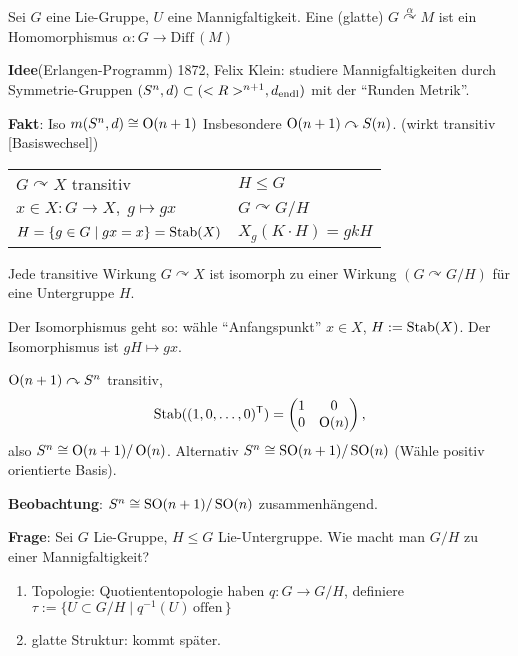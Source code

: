 \begin{definition}
	Sei $G$ eine Lie-Gruppe, $U$ eine Mannigfaltigkeit. Eine (glatte)  $G\overset{\alpha}{\curvearrowright} M$ ist ein Homomorphismus $\alpha\colon G\to \mathrm{Diff}\,(M)$
\end{definition}

\textbf{Idee}(Erlangen-Programm) 1872, Felix Klein: studiere Mannigfaltigkeiten durch Symmetrie-Gruppen $(S^n, d)\subset (<R>^{n+1}, d_{\mathrm{endl}})$ mit der "`Runden Metrik"'.

\textbf{Fakt}: Iso $m(S^n,d)\cong \operatorname{O}(n+1)$ Insbesondere $\operatorname{O}(n+1)\curvearrowright S(n)$. (wirkt transitiv [Basiswechsel])

\begin{tabularx}{\linewidth}{ll}
	$G\curvearrowright X$ transitiv & $H\le G$ \\$x\in X\colon G\to X,\; g\mapsto gx$ & $G\curvearrowright G\slash H$ \\ $H = \{g\in G\mid gx=x\} = \operatorname{Stab}(X)$ & $X_g(K\cdot H) = gk H$
\end{tabularx}

\begin{proposition}
	Jede transitive Wirkung $G\curvearrowright X$ ist isomorph zu einer Wirkung $(G\curvearrowright G\slash H)$ für eine Untergruppe $H$.
	
	Der Isomorphismus geht so: wähle "`Anfangspunkt"' $x\in X$, $H:=\operatorname{Stab}(X)$. Der Isomorphismus ist $gH\mapsto gx$.
\end{proposition}

\begin{*example}
	$\operatorname{O}(n+1)\curvearrowright S^n$ transitiv, \begin{align*}
	\operatorname{Stab}((1,0,\dots,0)^\mathsf{T}) = \begin{pmatrix}
		1 & 0 \\ 0 & \operatorname{O}(n)
	\end{pmatrix},
	\end{align*}
	also $S^n\cong\operatorname{O}(n+1)\slash \operatorname{O}(n)$. Alternativ $S^n\cong \operatorname{SO}(n+1)\slash \operatorname{SO}(n)$ (Wähle positiv orientierte Basis).
\end{*example}

\textbf{Beobachtung}: $S^n\cong \operatorname{SO}(n+1)\slash \operatorname{SO}(n)$ zusammenhängend.

\textbf{Frage}: Sei $G$ Lie-Gruppe, $H\le G$ Lie-Untergruppe. Wie macht man $G\slash H$ zu einer Mannigfaltigkeit? \begin{enumerate}
	\item[\circled{1}] Topologie: Quotiententopologie haben $q\colon G\to G\slash H$, definiere $\tau := \{ U\subset G\slash H\mid q^{-1} (U)\,\text{offen}\, \}$
	\item[\circled{2}] glatte Struktur: kommt später.
\end{enumerate}

